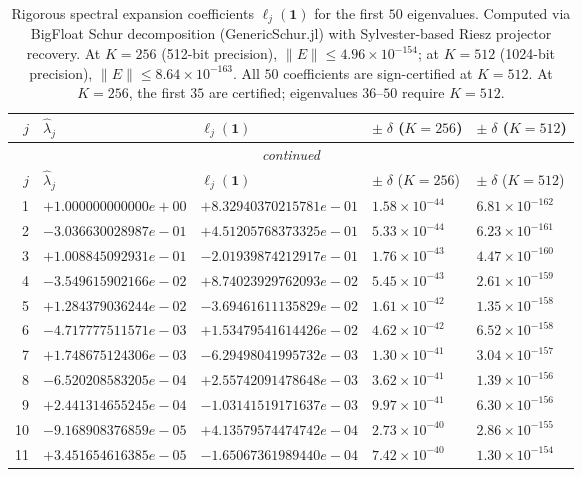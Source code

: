 \documentclass[11pt]{article}
\begin{document}
\begin{longtable}{rllll}
\caption{Rigorous spectral expansion coefficients $\ell_j(\mathbf{1})$ for the first $50$ eigenvalues.
Computed via BigFloat Schur decomposition (GenericSchur.jl) with Sylvester-based Riesz projector recovery.
At $K = 256$ (512-bit precision), $\|E\| \leq 4.96 \times 10^{-154}$;
at $K = 512$ (1024-bit precision), $\|E\| \leq 8.64 \times 10^{-163}$.
All $50$ coefficients are sign-certified at $K = 512$.
At $K = 256$, the first $35$ are certified; eigenvalues $36$--$50$ require $K = 512$.}
\label{tab:spectral-coefficients}\\
\toprule
$j$ & $\hat\lambda_j$ & $\ell_j(\mathbf{1})$ & $\pm\;\delta$ ($K\!=\!256$) & $\pm\;\delta$ ($K\!=\!512$) \\
\midrule
\endfirsthead
\multicolumn{5}{c}{\textit{continued}} \\
\toprule
$j$ & $\hat\lambda_j$ & $\ell_j(\mathbf{1})$ & $\pm\;\delta$ ($K\!=\!256$) & $\pm\;\delta$ ($K\!=\!512$) \\
\midrule
\endhead
1 & $+1.000000000000e+00$ & $+8.32940370215781e-01$ & $1.58 \times 10^{-44}$ & $6.81 \times 10^{-162}$ \\
2 & $-3.036630028987e-01$ & $+4.51205768373325e-01$ & $5.33 \times 10^{-44}$ & $6.23 \times 10^{-161}$ \\
3 & $+1.008845092931e-01$ & $-2.01939874212917e-01$ & $1.76 \times 10^{-43}$ & $4.47 \times 10^{-160}$ \\
4 & $-3.549615902166e-02$ & $+8.74023929762093e-02$ & $5.45 \times 10^{-43}$ & $2.61 \times 10^{-159}$ \\
5 & $+1.284379036244e-02$ & $-3.69461611135829e-02$ & $1.61 \times 10^{-42}$ & $1.35 \times 10^{-158}$ \\
6 & $-4.717777511571e-03$ & $+1.53479541614426e-02$ & $4.62 \times 10^{-42}$ & $6.52 \times 10^{-158}$ \\
7 & $+1.748675124306e-03$ & $-6.29498041995732e-03$ & $1.30 \times 10^{-41}$ & $3.04 \times 10^{-157}$ \\
8 & $-6.520208583205e-04$ & $+2.55742091478648e-03$ & $3.62 \times 10^{-41}$ & $1.39 \times 10^{-156}$ \\
9 & $+2.441314655245e-04$ & $-1.03141519171637e-03$ & $9.97 \times 10^{-41}$ & $6.30 \times 10^{-156}$ \\
10 & $-9.168908376859e-05$ & $+4.13579574474742e-04$ & $2.73 \times 10^{-40}$ & $2.86 \times 10^{-155}$ \\
11 & $+3.451654616385e-05$ & $-1.65067361989440e-04$ & $7.42 \times 10^{-40}$ & $1.30 \times 10^{-154}$ \\

\end{longtable}
\end{document}

